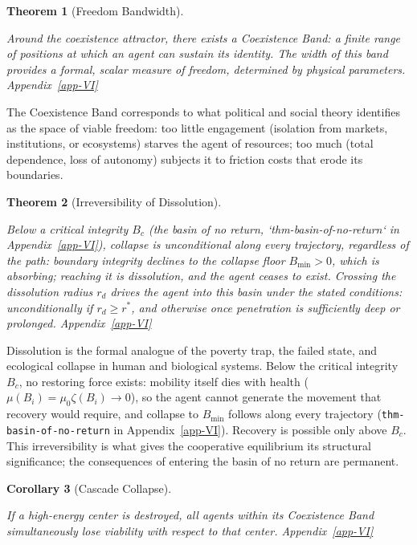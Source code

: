 \documentclass[11pt]{article}
\theoremstyle{plain}
\newtheorem{theorem}{Theorem}
\newtheorem{corollary}[theorem]{Corollary}
\theoremstyle{definition}
\theoremstyle{remark}
\begin{document}
\begin{theorem}[Freedom Bandwidth]
\label{ethics-thm-freedom-bandwidth}

Around the coexistence attractor, there exists a Coexistence Band: a finite range of positions at which an agent can sustain its identity. The width of this band provides a formal, scalar measure of freedom, determined by physical parameters. Appendix~\ref{app-VI}
\end{theorem}

The Coexistence Band corresponds to what political and social theory
identifies as the space of viable freedom: too little engagement
(isolation from markets, institutions, or ecosystems) starves the agent
of resources; too much (total dependence, loss of autonomy) subjects it
to friction costs that erode its boundaries.

\begin{theorem}[Irreversibility of Dissolution]
\label{ethics-thm-dissolution}

Below a critical integrity $B_c$ (the basin of no return, `thm-basin-of-no-return` in Appendix~\ref{app-VI}), collapse is unconditional along every trajectory, regardless of the path: boundary integrity declines to the collapse floor $B_{\min} > 0$, which is absorbing; reaching it is dissolution, and the agent ceases to exist. Crossing the dissolution radius $r_d$ drives the agent into this basin under the stated conditions: unconditionally if $r_d \geq r^*$, and otherwise once penetration is sufficiently deep or prolonged. Appendix~\ref{app-VI}
\end{theorem}

Dissolution is the formal analogue of the poverty trap, the failed
state, and ecological collapse in human and biological systems. Below
the critical integrity \(B_c\), no restoring force exists: mobility
itself dies with health (\(\mu(B_i) = \mu_0 \zeta(B_i) \to 0\)), so the
agent cannot generate the movement that recovery would require, and
collapse to \(B_{\min}\) follows along every trajectory
(\texttt{thm-basin-of-no-return} in Appendix~\ref{app-VI}). Recovery is
possible only above \(B_c\). This irreversibility is what gives the
cooperative equilibrium its structural significance; the consequences of
entering the basin of no return are permanent.

\begin{corollary}[Cascade Collapse]
\label{ethics-cor-cascade}

If a high-energy center is destroyed, all agents within its Coexistence Band simultaneously lose viability with respect to that center. Appendix~\ref{app-VI}
\end{corollary}
\end{document}
